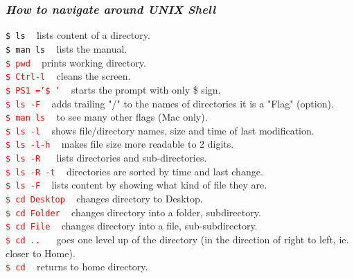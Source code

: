 \documentclass{article}
\begin{document}
\subsubsection{\small\textsl{How to navigate around UNIX Shell}}
\texttt{\$ ls} ~ lists content of a directory.\\ 
\texttt{\$ man ls} ~ lists the manual.\\ 
\textcolor{red}{\texttt{\$ pwd}} ~ prints working directory.\\
\textcolor{red}{\texttt{\$ Ctrl-l}} ~ cleans the screen.\\ 
\textcolor{red}{\texttt{\$ PS1 ='\$ '}} ~ starts the prompt with only \$ sign.\\  
\textcolor{red}{\texttt{\$ ls -F}}	 ~	adds trailing "/" to the names of directories
     		it is a "Flag" (option).\\ 
\textcolor{red}{\texttt{\$ man ls}} ~	to see many other flags (Mac only).\\ 
\textcolor{red}{\texttt{\$ ls -l}} ~ shows file/directory names, size and time of last modification.\\ 
\textcolor{red}{\texttt{\$ ls -l-h}} ~ makes file size more readable to 2 digits.\\ 
\textcolor{red}{\texttt{\$ ls -R	}} ~	lists directories and sub-directories.\\ 
\textcolor{red}{\texttt{\$ ls -R -t}} ~ directories are sorted by time and last change.\\ 
\textcolor{red}{\texttt{\$ ls -F}} ~  lists content by showing what kind of file they are.\\
\textcolor{red}{\texttt{\$ cd Desktop}} ~  	changes directory to Desktop.\\
\textcolor{red}{\texttt{\$ cd Folder}} ~	changes directory into a folder, subdirectory. \\
\textcolor{red}{\texttt{\$ cd File}} ~ 	changes directory into a file, sub-subdirectory. \\
\textcolor{red}{\texttt{\$ cd ..	}} ~	goes one level up of the directory (in the direction of right to left, ie. closer to Home).\\
\textcolor{red}{\texttt{\$ cd}} ~ returns to home directory. \\
\end{document}
